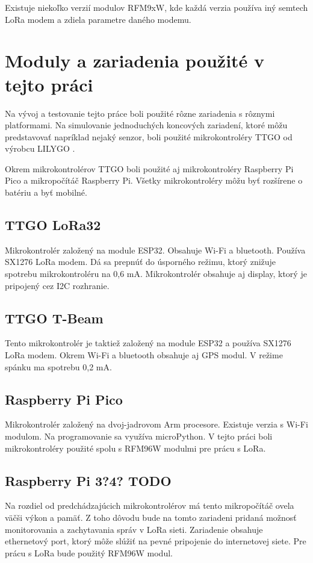 \documentclass[slovak,master]{diploma}
\begin{document}
Existuje niekoľko verzií modulov RFM9xW, kde každá verzia používa iný semtech LoRa modem a zdiela parametre daného modemu.

\section{Moduly a zariadenia použité v tejto práci}
Na vývoj a testovanie tejto práce boli použité rôzne zariadenia s rôznymi platformami. Na simulovanie jednoduchých koncových zariadení, 
ktoré môžu predstavovať napríklad nejaký senzor, boli použité mikrokontroléry TTGO od výrobcu LILYGO \cite{lilygo}.

Okrem mikrokontrolérov TTGO boli použité aj mikrokontroléry Raspberry Pi Pico a mikropočítáč Raspberry Pi.
Všetky mikrokontroléry môžu byť rozšírene o batériu a byť mobilné.

\subsection{TTGO LoRa32}
Mikrokontrolér založený na module ESP32. Obsahuje Wi-Fi a bluetooth. Používa SX1276 LoRa modem.
Dá sa prepnúť do úsporného režimu, ktorý znižuje spotrebu mikrokontroléru na 0,6 mA.
Mikrokontrolér obsahuje aj display, ktorý je pripojený cez I2C rozhranie.

\subsection{TTGO T-Beam}
Tento mikrokontrolér je taktiež založený na module ESP32 a používa SX1276 LoRa modem. Okrem Wi-Fi a bluetooth obsahuje aj GPS modul.
V režime spánku ma spotrebu 0,2 mA.

\subsection{Raspberry Pi Pico}
Mikrokontrolér založený na dvoj-jadrovom Arm procesore. Existuje verzia s Wi-Fi modulom. Na programovanie sa využíva microPython. %
V tejto práci boli mikrokontroléry použité spolu s RFM96W modulmi pre prácu s LoRa.

\subsection{Raspberry Pi 3?4? TODO}
Na rozdiel od predchádzajúcich mikrokontrolérov má tento mikropočítáč ovela väčši výkon a pamäť. Z toho dôvodu bude na tomto zariadeni pridaná 
možnosť monitorovania a zachytavania správ v LoRa sieti. Zariadenie obsahuje ethernetový port, ktorý môže slúžiť na pevné pripojenie do internetovej siete.
Pre prácu s LoRa bude použitý RFM96W modul.
\end{document}
